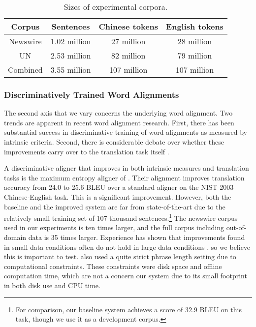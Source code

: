 \figpreamble
\begin{table}
	\begin{center}
	\begin{tabular}{cccc}
		Corpus & Sentences & Chinese tokens & English tokens \\ \hline
		Newswire & 1.02 million & 27 million & 28 million \\
		UN & 2.53 million & 82 million & 79 million \\
		Combined & 3.55 million & 107 million & 107 million \\
	\end{tabular}
	\end{center}
	\figpostamble
	\caption {Sizes of experimental corpora.}
	\label{table:corpus-statistics}
\end{table}


\subsubsection{Discriminatively Trained Word Alignments}
\label{sec:discriminative-alignment}

The second axis that we vary concerns the underlying word alignment.
Two trends are apparent in recent word alignment research.
First, there has been substantial success in discriminative
training of word alignments as measured by intrinsic
criteria.  Second, there is considerable debate over whether
these improvements carry over to the translation task itself
\citep{Ayan:2006:acl-coling,Fraser:2007:cl,Lopez:2006:amta}.

A discriminative aligner that improves in both intrinsic
measures and translation tasks is the
maximum entropy aligner of \citet{Ayan:2006:hlt-naacl}.
Their alignment improves translation accuracy from 24.0
to 25.6 BLEU over a standard aligner on the NIST 2003
Chinese-English task.  This is a significant improvement.
However, both the baseline and the improved system are
far from state-of-the-art due to the relatively small training
set of 107 thousand sentences.\footnote{For comparison,
our baseline system achieves a score of 32.9 BLEU on this task, 
though we use it as a development corpus.}  The newswire 
corpus used in our experiments is ten times larger, and the
full corpus including out-of-domain data is 35 times 
larger.  Experience has shown that improvements found in
small data conditions often do not hold in large data 
conditions \citep{Fraser:2007:cl,Lopez:2006:amta},
so we believe this is important to test.
\citet{Ayan:2006:hlt-naacl} also used a quite
strict phrase length setting due to computational constraints.
These constraints were disk space and offline
computation time, which are not a concern our system
due to its small footprint in both disk use and CPU
time.

